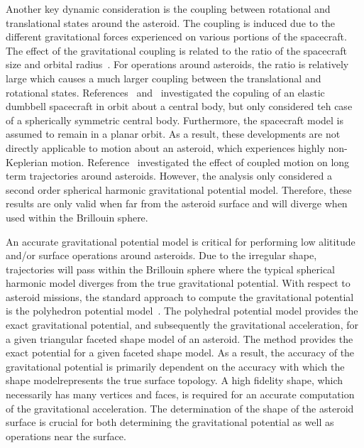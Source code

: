 \documentclass[letterpaper, paper,11pt]{AAS}		%
\begin{document}
Another key dynamic consideration is the coupling between rotational and translational states around the asteroid.
The coupling is induced due to the different gravitational forces experienced on various portions of the spacecraft. 
The effect of the gravitational coupling is related to the ratio of the spacecraft size and orbital radius~\cite{hughes2004}.
For operations around asteroids, the ratio is relatively large which causes a much larger coupling between the translational and rotational states.
References~\cite{elmasri2005} and~\cite{sanyal2004a} investigated the copuling of an elastic dumbbell spacecraft in orbit about a central body, but only considered teh case of a spherically symmetric central body.
Furthermore, the spacecraft model is assumed to remain in a planar orbit.
As a result, these developments are not directly applicable to motion about an asteroid, which experiences highly non-Keplerian motion.
Reference~\cite{misra2015b} investigated the effect of coupled motion on long term trajectories around asteroids.
However, the analysis only considered a second order spherical harmonic gravitational potential model. 
Therefore, these results are only valid when far from the asteroid surface and will diverge when used within the Brillouin sphere.

An accurate gravitational potential model is critical for performing low alititude and/or surface operations around asteroids.
Due to the irregular shape, trajectories will pass within the Brillouin sphere where the typical spherical harmonic model diverges from the true gravitational potential.
With respect to asteroid missions, the standard approach to compute the gravitational potential is the polyhedron potential model~\cite{werner1996}.
The polyhedral potential model provides the exact gravitational potential, and subsequently the gravitational acceleration, for a given triangular faceted shape model of an asteroid.
The method provides the exact potential for a given faceted shape model.
As a result, the accuracy of the gravitational potential is primarily dependent on the accuracy with which the shape modelrepresents the true surface topology.
A high fidelity shape, which necessarily has many vertices and faces, is required for an accurate computation of the gravitational acceleration.
The determination of the shape of the asteroid surface is crucial for both determining the gravitational potential as well as operations near the surface.
\end{document}
